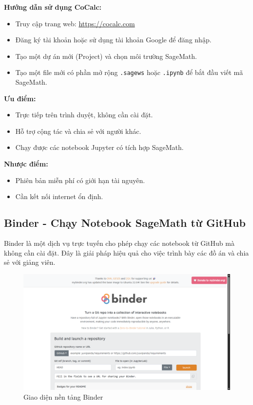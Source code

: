 \textbf{Hướng dẫn sử dụng CoCalc:}
\begin{itemize}
	\item Truy cập trang web: \url{https://cocalc.com}
	\item Đăng ký tài khoản hoặc sử dụng tài khoản Google để đăng nhập.
	\item Tạo một dự án mới (Project) và chọn môi trường SageMath.
	\item Tạo một file mới có phần mở rộng \texttt{.sagews} hoặc \texttt{.ipynb} để bắt đầu viết mã SageMath.
\end{itemize}

\textbf{Ưu điểm:}
\begin{itemize}
	\item Trực tiếp trên trình duyệt, không cần cài đặt.
	\item Hỗ trợ cộng tác và chia sẻ với người khác.
	\item Chạy được các notebook Jupyter có tích hợp SageMath.
\end{itemize}

\textbf{Nhược điểm:}
\begin{itemize}
	\item Phiên bản miễn phí có giới hạn tài nguyên.
	\item Cần kết nối internet ổn định.
\end{itemize}

\subsection{Binder - Chạy Notebook SageMath từ GitHub}

Binder là một dịch vụ trực tuyến cho phép chạy các notebook từ GitHub mà không cần cài đặt. Đây là giải pháp hiệu quả cho việc trình bày các đồ án và chia sẻ với giảng viên.
\begin{figure}[H]
	\centering
	\includegraphics[width=0.7\linewidth]{images/screenshot003}
	\caption{Giao diện nền tảng Binder}
	\label{fig:screenshot003}
\end{figure}

